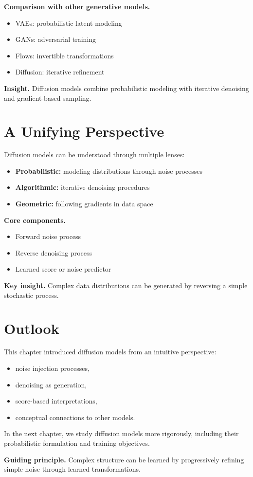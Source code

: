 \medskip

\noindent
\textbf{Comparison with other generative models.}
\begin{itemize}
    \item VAEs: probabilistic latent modeling
    \item GANs: adversarial training
    \item Flows: invertible transformations
    \item Diffusion: iterative refinement
\end{itemize}

\medskip

\noindent
\textbf{Insight.}  
Diffusion models combine probabilistic modeling with iterative denoising and gradient-based sampling.

\section{A Unifying Perspective}

Diffusion models can be understood through multiple lenses:

\begin{itemize}
    \item \textbf{Probabilistic:} modeling distributions through noise processes
    \item \textbf{Algorithmic:} iterative denoising procedures
    \item \textbf{Geometric:} following gradients in data space
\end{itemize}

\medskip

\noindent
\textbf{Core components.}
\begin{itemize}
    \item Forward noise process
    \item Reverse denoising process
    \item Learned score or noise predictor
\end{itemize}

\medskip

\noindent
\textbf{Key insight.}  
Complex data distributions can be generated by reversing a simple stochastic process.

\section{Outlook}

This chapter introduced diffusion models from an intuitive perspective:
\begin{itemize}
    \item noise injection processes,
    \item denoising as generation,
    \item score-based interpretations,
    \item conceptual connections to other models.
\end{itemize}

\medskip

In the next chapter, we study diffusion models more rigorously, including their probabilistic formulation and training objectives.

\medskip

\noindent
\textbf{Guiding principle.}  
Complex structure can be learned by progressively refining simple noise through learned transformations.